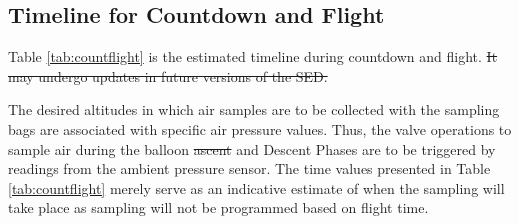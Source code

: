 \documentclass[a4paper,12pt,oneside]{article} %
\providecommand{\DIFaddtex}[1]{{\protect\color{blue}\uwave{#1}}} %
\providecommand{\DIFdeltex}[1]{{\protect\color{red}\sout{#1}}}                      %
\providecommand{\DIFaddbegin}{} %
\providecommand{\DIFaddend}{} %
\providecommand{\DIFdelbegin}{} %
\providecommand{\DIFdelend}{} %
\providecommand{\DIFadd}[1]{\texorpdfstring{\DIFaddtex{#1}}{#1}} %
\providecommand{\DIFdel}[1]{\texorpdfstring{\DIFdeltex{#1}}{}} %
\newcommand{\DIFscaledelfig}{0.5}
\newlength{\DIFdelgraphicswidth} %
\newlength{\DIFdelgraphicsheight} %
\newcommand{\DIFaddincludegraphics}[2][]{{\color{blue}\fbox{\DIFOincludegraphics[#1]{#2}}}} %
\newcommand{\DIFdelincludegraphics}[2][]{%
\sbox{\DIFdelgraphicsbox}{\DIFOincludegraphics[#1]{#2}}%
\settoboxwidth{\DIFdelgraphicswidth}{\DIFdelgraphicsbox} %
\settoboxtotalheight{\DIFdelgraphicsheight}{\DIFdelgraphicsbox} %
\scalebox{\DIFscaledelfig}{%
\parbox[b]{\DIFdelgraphicswidth}{\usebox{\DIFdelgraphicsbox}\\[-\baselineskip] \rule{\DIFdelgraphicswidth}{0em}}\llap{\resizebox{\DIFdelgraphicswidth}{\DIFdelgraphicsheight}{%
\setlength{\unitlength}{\DIFdelgraphicswidth}%
\begin{picture}(1,1)%
\thicklines\linethickness{2pt} %
{\color[rgb]{1,0,0}\put(0,0){\framebox(1,1){}}}%
{\color[rgb]{1,0,0}\put(0,0){\line( 1,1){1}}}%
{\color[rgb]{1,0,0}\put(0,1){\line(1,-1){1}}}%
\end{picture}%
}\hspace*{3pt}}} %
} %
\DeclareRobustCommand{\DIFaddbegin}{\DIFOaddbegin \let\includegraphics\DIFaddincludegraphics} %
\DeclareRobustCommand{\DIFaddend}{\DIFOaddend \let\includegraphics\DIFOincludegraphics} %
\DeclareRobustCommand{\DIFdelbegin}{\DIFOdelbegin \let\includegraphics\DIFdelincludegraphics} %
\DeclareRobustCommand{\DIFdelend}{\DIFOaddend \let\includegraphics\DIFOincludegraphics} %
\begin{document}
\pagebreak
\subsection{Timeline for Countdown and Flight}
Table \ref{tab:countflight} is the estimated timeline during countdown and flight. 
\DIFdelbegin \DIFdel{It may undergo updates in future versions of the SED.
}\DIFdelend 

The desired altitudes in which air samples are to be collected with the sampling bags are associated with specific air pressure values. Thus, the valve operations to sample air during the balloon \DIFdelbegin \DIFdel{ascent }\DIFdelend \DIFaddbegin \DIFadd{Ascent }\DIFaddend and Descent Phases are to be triggered by readings from the ambient pressure sensor. The time values presented in Table \ref{tab:countflight} merely serve as an indicative estimate of when the sampling will take place as sampling will not be programmed based on flight time.
\end{document}
